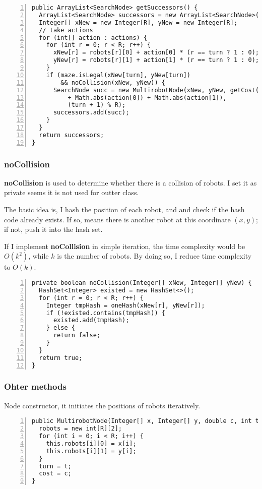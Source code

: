 \documentclass{article}
\begin{document}
\begin{lstlisting}[numbers=left]
public ArrayList<SearchNode> getSuccessors() {
  ArrayList<SearchNode> successors = new ArrayList<SearchNode>();
  Integer[] xNew = new Integer[R], yNew = new Integer[R];
  // take actions
  for (int[] action : actions) {
    for (int r = 0; r < R; r++) {
      xNew[r] = robots[r][0] + action[0] * (r == turn ? 1 : 0);
      yNew[r] = robots[r][1] + action[1] * (r == turn ? 1 : 0);
    }
    if (maze.isLegal(xNew[turn], yNew[turn])
        && noCollision(xNew, yNew)) {
      SearchNode succ = new MultirobotNode(xNew, yNew, getCost()
          + Math.abs(action[0]) + Math.abs(action[1]),
          (turn + 1) % R);
      successors.add(succ);
    }
  }
  return successors;
}
\end{lstlisting}


\subsubsection{noCollision}

\textbf{noCollision} is used to determine whether there is a collision of robots. I set it as private seems it is not used for outter class.

The basic idea is, I hash the position of each robot, and and check if the hash code already exists. If so, means there is another robot at this coordinate $(x,y)$; if not, push it into the hash set.

If I implement \textbf{noCollision} in simple iteration, the time complexity would be $O(k^2)$, while $k$ is the number of robots. By doing so, I reduce time complexity to $O(k)$.

\begin{lstlisting}[numbers=left]
private boolean noCollision(Integer[] xNew, Integer[] yNew) {
  HashSet<Integer> existed = new HashSet<>();
  for (int r = 0; r < R; r++) {
    Integer tmpHash = oneHash(xNew[r], yNew[r]);
    if (!existed.contains(tmpHash)) {
      existed.add(tmpHash);
    } else {
      return false;
    }
  }
  return true;
}
\end{lstlisting}




\subsubsection{Ohter methods}
Node constructor, it initiates the positions of robots iteratively.

\begin{lstlisting}[numbers=left]
public MultirobotNode(Integer[] x, Integer[] y, double c, int t) {
  robots = new int[R][2];
  for (int i = 0; i < R; i++) {
    this.robots[i][0] = x[i];
    this.robots[i][1] = y[i];
  }
  turn = t;
  cost = c;
}
\end{lstlisting}
\end{document}
